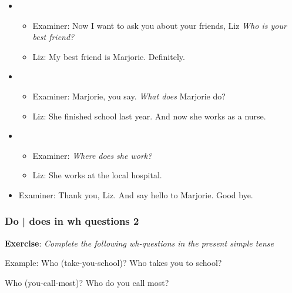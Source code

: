 \begin{itemize}
\item
\begin{itemize}
\item Examiner: Now I want to ask you about your friends, Liz \textit{Who is your best friend?}
\item Liz: My best friend is Marjorie. Definitely.
\end{itemize}

\item
\begin{itemize}
\item Examiner: Marjorie, you say. \textit{What does} Marjorie do?
\item Liz: She finished school last year. And now she works as a nurse.
\end{itemize}

\item
\begin{itemize}
\item Examiner: \textit{Where does she work?}
\item Liz: She works at the local hospital.
\end{itemize}

\item Examiner: Thank you, Liz. And say hello to Marjorie. Good bye.

\end{itemize}

\subsubsection{Do | does in wh questions 2}

\textbf{Exercise}: \textit{Complete the following wh-questions in the present simple tense}

Example: Who (take-you-school)?
Who takes you to school?

Who (you-call-most)?
Who do you call most?

